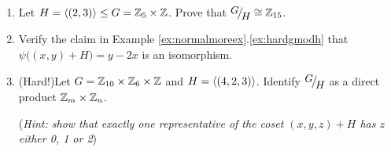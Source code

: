 \begin{exercises}
\begin{enumerate}
		
		\item Let $H=\left\langle (2,3)\right\rangle\le G=\mathbb{Z}_5\times \mathbb{Z}$. Prove that $\quotient GH\cong \Z_{15}$.
		
		
		\item Verify the claim in Example \ref*{ex:normalmoreex}.\ref{ex:hardgmodh} that $\psi\bigl((x,y)+H\bigr)=y-2x$ is an isomorphism.
		
		
		\item (Hard!)\lstsp Let $G=\mathbb{Z}_{10}\times\mathbb{Z}_6\times\mathbb{Z}$ and $H=\left\langle (4,2,3)\right\rangle$. Identify $\quotient GH$ as a direct product $\mathbb{Z}_m\times\mathbb{Z}_n$.\par
		(\emph{Hint: show that exactly one representative of the coset $(x,y,z)+H$ has $z$ either 0, 1 or 2})
		
		
	

\end{enumerate}
\end{exercises}
